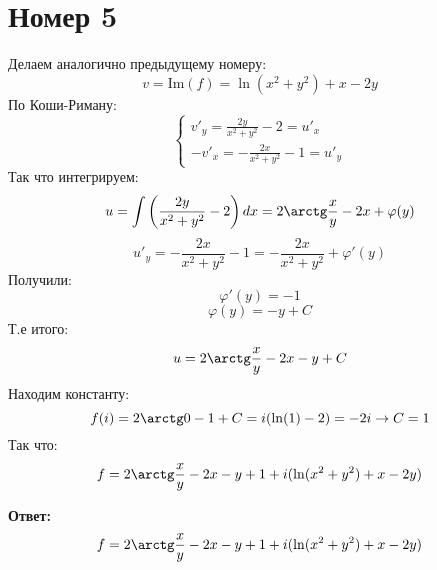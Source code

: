\documentclass[a4paper,12pt]{article}
\begin{document}
\section*{Номер 5}
Делаем аналогично предыдущему номеру:
\[
v = 
\text{Im} (f) = \ln(x^2 +y^2) + x - 2y
\]
По Коши-Риману:
\[
\begin{cases}
v'_y = \frac{2y}{x^2 + y^2} - 2 = u'_x \\
-v'_x = - \frac{2x}{x^2 + y^2}  -1 = u'_y 
\end{cases}
\]
Так что интегрируем:
\[
u = \int \left(
\frac{2y}{x^2 + y^2} - 2 
\right) dx  = 2 \arctg \frac{x}{y} - 2x + \varphi(y) 
\]
\[
u'_y = - \frac{2x}{x^2 + y^2}  -1 = -\frac{2x}{x^2 + y^2} + \varphi'(y) 
\]
Получили:
\[
\varphi'(y)  = -1
\]
\[
\varphi(y) = -y + C
\]
Т.е итого:
\[
u = 2\arctg \frac{x}{y} - 2x - y + C
\]
Находим константу:
\[
f(i) = 2 \arctg 0 - 1 + C = i( \ln(1) -2)  = -2i \rightarrow C = 1
\]
Так что:
\[
f = 2 \arctg \frac{x}{y} - 2x - y + 1 + i (\ln(x^2 + y^2) + x - 2y) 
\]
\begin{center}
\textbf{Ответ: } 
\[
f = 2 \arctg \frac{x}{y} - 2x - y + 1 + i (\ln(x^2 + y^2) + x - 2y) 
\]
\end{center}
\end{document}
